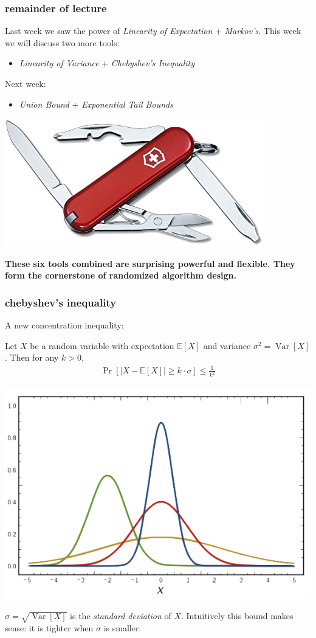 \documentclass[handout,compress]{beamer}
\newcommand{\E}{\mathbb{E}}
\DeclareMathOperator{\Var}{Var}
\begin{document}
\begin{frame}
	\frametitle{remainder of lecture}
	Last week we saw the power of \emph{Linearity of Expectation} + \emph{Markov's}. This week we will discuss two more tools:
	\begin{itemize}
		\item \emph{Linearity of Variance} + \emph{Chebyshev's Inequality}
	\end{itemize}
	Next week:
	\begin{itemize}
	\item \emph{Union Bound} + \emph{Exponential Tail Bounds}
	\end{itemize}
	\begin{center}
		\includegraphics[width=.5\textwidth]{4function.png}
		
		\textbf{\alert{These six tools combined are surprising powerful and flexible. They form the cornerstone of randomized algorithm design.}}
	\end{center}
 \end{frame}

\begin{frame}
	\frametitle{chebyshev's inequality}
	\small
	A new concentration inequality:
	\begin{lemma}
		Let $X$ be a random variable with expectation $\E[X]$ and variance $\sigma^2 = \Var[X]$. Then for any $k > 0$,
		\begin{align*}
			\Pr[|X - \E[X]| \geq k\cdot\sigma] \leq \frac{1}{k^2}
		\end{align*}
	\end{lemma}
	\vspace{-.5em}
	\begin{center}
		\includegraphics[width=.4\textwidth]{rvs.png}
		
		$\sigma = \sqrt{\Var[X]}$ is the \emph{standard deviation} of $X$. Intuitively this bound makes sense: it is {tighter} when $\sigma$ is smaller.
	\end{center}
\end{frame}
\end{document}
